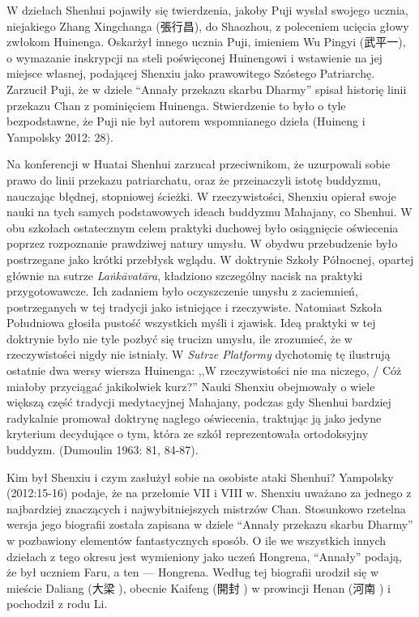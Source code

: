 W dziełach Shenhui pojawiły się twierdzenia, jakoby Puji wysłał swojego ucznia, niejakiego Zhang Xingchanga (張行昌), do Shaozhou, z poleceniem ucięcia głowy zwłokom Huinenga.
Oskarżył innego ucznia Puji, imieniem Wu Pingyi (武平一), o wymazanie inskrypcji na steli poświęconej Huinengowi i wstawienie na jej miejsce własnej, podającej Shenxiu jako prawowitego Szóstego Patriarchę.
Zarzucił Puji, że w dziele ``Annały przekazu skarbu Dharmy'' spisał historię linii przekazu Chan z pominięciem Huinenga.
Stwierdzenie to było o tyle bezpodstawne, że Puji nie był autorem wspomnianego dzieła
(Huineng i Yampolsky 2012: 28).

Na konferencji w Huatai Shenhui zarzucał przeciwnikom, że uzurpowali sobie prawo do linii przekazu patriarchatu, oraz że przeinaczyli istotę buddyzmu, nauczając błędnej, stopniowej ścieżki.
W rzeczywistości, Shenxiu opierał swoje nauki na tych samych podstawowych ideach buddyzmu Mahajany, co Shenhui.
W obu szkołach ostatecznym celem praktyki duchowej było osiągnięcie oświecenia poprzez rozpoznanie prawdziwej natury umysłu.
W obydwu przebudzenie było postrzegane jako krótki przebłysk wglądu.
W doktrynie Szkoły Północnej, opartej głównie na sutrze \textit{La\.nkā\-vatāra}, kładziono szczególny nacisk na praktyki przygotowawcze.
Ich zadaniem było oczyszczenie umysłu z zaciemnień, postrzeganych w tej tradycji jako istniejące i rzeczywiste.
Natomiast Szkoła Południowa głosiła pustość wszystkich myśli i zjawisk.
Ideą praktyki w tej doktrynie było nie tyle pozbyć się trucizn umysłu, ile zrozumieć, że w rzeczywistości nigdy nie istniały.
W \textit{Sutrze Platformy} dychotomię tę ilustrują ostatnie dwa wersy wiersza Huinenga: ,,W rzeczywistości nie ma niczego, / Cóż miałoby przyciągać jakikolwiek kurz?'' %
Nauki Shenxiu obejmowały o wiele większą część tradycji medytacyjnej Mahajany, podczas gdy Shenhui bardziej radykalnie promował doktrynę nagłego oświecenia, traktując ją jako jedyne kryterium decydujące o tym, która ze szkół reprezentowała ortodoksyjny buddyzm.
(Dumoulin 1963: 81, 84-87). %

Kim był Shenxiu i czym zasłużył sobie na osobiste ataki Shenhui?
Yampolsky (2012:15-16) podaje, że na przełomie VII i VIII w. Shenxiu uważano za jednego z najbardziej znaczących i najwybitniejszych mistrzów Chan.
Stosunkowo rzetelna wersja jego biografii została zapisana w dziele ``Annały przekazu skarbu Dharmy'' w pozbawiony elementów fantastycznych sposób.
O ile we wszystkich innych dziełach z tego okresu jest wymieniony jako uczeń Hongrena, ``Annały'' podają, że był uczniem Faru, a ten --- Hongrena.
Według tej biografii urodził się w mieście Daliang (大梁 ), obecnie Kaifeng (開封 ) w prowincji Henan (河南 ) i pochodził z rodu Li.

